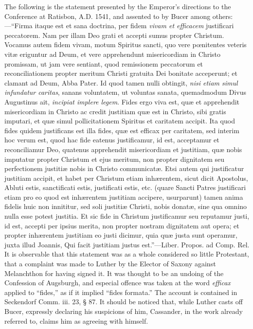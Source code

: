 The following is the statement presented by the Emperor's
directions to the Conference at Ratisbon, A.D. 1541, and assented to
by Bucer among others:—``Firma itaque est et sana doctrina, per
fidem \emph{vivam et efficacem} justificari peccatorem. Nam per illam
Deo grati et accepti sumus propter Christum. Vocamus autem fidem vivam,
motum Spiritus sancti, quo vere pœnitentes veteris vitæ eriguntur ad
Deum, et vere apprehendunt misericordiam in Christo promissam, ut jam
vere sentiant, quod remissionem peccatorum et reconciliationem propter
meritum Christi gratuita Dei bonitate acceperunt; et clamant ad Deum,
Abba Pater. Id quod tamen nulli obtingit, \emph{nisi etiam simul
infundatur caritas}, sanans voluntatem, ut voluntas sanata,
quemadmodum Divus Augustinus ait, \emph{incipiat implere legem}. Fides
ergo viva est, quæ et apprehendit misericordiam in Christo ac credit
justitiam quæ est in Christo, sibi gratis imputari, et quæ simul
pollicitationem Spiritus et caritatem accipit. Ita quod fides quidem
justificans est illa fides, quæ est efficax per caritatem, sed
interim hoc verum est, quod hac fide eatenus justificamur, id est,
acceptamur et reconciliamur Deo, quatenus apprehendit misericordiam et
justitiam, quæ nobis imputatur propter Christum et ejus meritum, non
propter dignitatem seu perfectionem justitiæ nobis in Christo
communicatæ. Etsi autem qui justificatur justitiam accipit, et habet
per Christum etiam inhærentem, sicut dicit Apostolus, Abluti estis, sanctificati estis, justificati estis, etc. (quare Sancti
Patres justificari etiam pro eo quod est inhærentem justitiam
accipere, usurparunt) tamen anima fidelis huic non innititur, sed soli
justitiæ Christi, nobis donatæ, sine qua omnino nulla esse potest
justitia. Et sic fide in Christum justificamur seu reputamur justi,
id est, accepti per ipsius merita, non propter nostram dignitatem aut
opera; et propter inhærentem justitiam eo justi dicimur, quia quæ
justa sunt operamur, juxta illud Joannis, Qui facit justitiam justus
est.''—Liber. Propos. ad Comp. Rel. It is observable that this
statement was as a whole considered so little Protestant, that a
complaint was made to Luther by the Elector of Saxony against
Melanchthon for having signed it. It was thought to be an undoing of
the Confession of Augsburgh, and especial offence was taken at the
word \emph{efficax} applied to ``fides,'' as if it implied
``fides formata.'' The account is contained in Seckendorf
Comm. iii. 23, § 87. It should be noticed that, while Luther casts
off Bucer, expressly declaring his suspicions of him, Cassander, in
the work already referred to, claims him as agreeing with himself.

